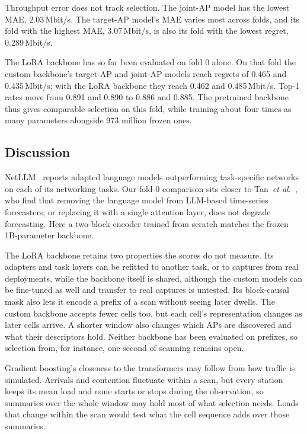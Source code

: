 \documentclass[conference]{IEEEtran}
\begin{document}
Throughput error does not track selection. The joint-AP model has the lowest
MAE, 2.03\,Mbit/s. The target-AP model's MAE varies most across folds, and its
fold with the highest MAE, 3.07\,Mbit/s, is also its fold with the lowest
regret, 0.289\,Mbit/s.

The LoRA backbone has so far been evaluated on fold 0 alone. On that fold the
custom backbone's target-AP and joint-AP models reach regrets of 0.465 and
0.435\,Mbit/s; with the LoRA backbone they reach 0.462 and 0.485\,Mbit/s.
Top-1 rates move from 0.891 and 0.890 to 0.886 and 0.885. The pretrained
backbone thus gives comparable selection on this fold, while training about
four times as many parameters alongside 973 million frozen ones.

\subsection{Discussion}

NetLLM~\cite{wu2024netllm} reports adapted language models outperforming
task-specific networks on each of its networking tasks. Our fold-0 comparison
sits closer to Tan~\emph{et al.}~\cite{tan2024useful}, who find that removing
the language model from LLM-based time-series forecasters, or replacing it
with a single attention layer, does not degrade forecasting. Here a two-block
encoder trained from scratch matches the frozen 1B-parameter backbone.

The LoRA backbone retains two properties the scores do not measure. Its
adapters and task layers can be refitted to another task, or to captures from
real deployments, while the backbone itself is shared, although the custom
models can be fine-tuned as well and transfer to real captures is untested.
Its block-causal mask also lets it encode a prefix of a scan without seeing
later dwells. The custom backbone accepts fewer cells too, but each cell's
representation changes as later cells arrive. A shorter window also changes
which APs are discovered and what their descriptors hold. Neither backbone has
been evaluated on prefixes, so selection from, for instance, one second of
scanning remains open.

Gradient boosting's closeness to the transformers may follow from how traffic
is simulated. Arrivals and contention fluctuate within a scan, but every
station keeps its mean load and none starts or stops during the observation,
so summaries over the whole window may hold most of what selection needs.
Loads that change within the scan would test what the cell sequence adds over
those summaries.
\end{document}
